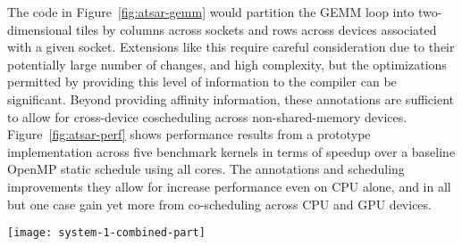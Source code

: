 The code in Figure~\ref{fig:atsar-gemm} would partition the GEMM loop into
two-dimensional tiles by columns across sockets and rows across devices
associated with a given socket.  Extensions like this require careful
consideration due to their potentially large number of changes, and high
complexity, but the optimizations permitted by providing this level of
information to the compiler can be significant.  Beyond providing affinity
information, these annotations are sufficient to allow for cross-device
coscheduling across non-shared-memory devices.  Figure~\ref{fig:atsar-perf}
shows performance results from a prototype implementation across five benchmark
kernels in terms of speedup over a baseline OpenMP static schedule using all
cores.  The annotations and scheduling improvements they allow for increase
performance even on CPU alone, and in all but one case gain yet more from
co-scheduling across CPU and GPU devices.


\begin{figure*}[t]
        \texttt{[image: system-1-combined-part]}
        \caption{Performance Benefit of Memory Partitioning/Affinity\label{fig:atsar-perf}}
\end{figure*}


